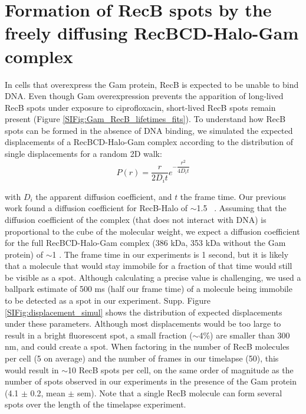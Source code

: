\section{Formation of RecB spots by the freely diffusing RecBCD-Halo-Gam complex}
\label{note:spurious_spots}
In cells that overexpress the Gam protein, RecB is expected to be unable to bind DNA. Even though Gam overexpression prevents the apparition of long-lived RecB spots under exposure to ciprofloxacin, short-lived RecB spots remain present (Figure \ref{SIFig:Gam_RecB_lifetimes_fits}). To understand how RecB spots can be formed in the absence of DNA binding, we simulated the expected displacements of a RecBCD-Halo-Gam complex according to the distribution of single displacements for a random 2D walk:
\begin{equation}
    P(r) = \dfrac{r}{2D_i t}e^{-\dfrac{r^2}{4D_i t}}
\end{equation}

with $D_i$ the apparent diffusion coefficient, and $t$ the frame time. Our previous work found a diffusion coefficient for RecB-Halo of $\sim$1.5 \ums\ \cite{Lepore2023}. Assuming that the diffusion coefficient of the complex (that does not interact with DNA) is proportional to the cube of the molecular weight, we expect a diffusion coefficient for the full RecBCD-Halo-Gam complex (386 kDa, 353 kDa without the Gam protein) of $\sim$1 \ums. The frame time in our experiments is 1 second, but it is likely that a molecule that would stay immobile for a fraction of that time would still be visible as a spot. Although calculating a precise value is challenging, we used a ballpark estimate of 500 ms (half our frame time) of a molecule being immobile to be detected as a spot in our experiment. Supp. Figure \ref{SIFig:displacement_simul} shows the distribution of expected displacements under these parameters. Although most displacements would be too large to result in a bright fluorescent spot, a small fraction ($\sim$4\%) are smaller than 300 nm, and could create a spot. When factoring in the number of RecB molecules per cell (5 on average\cite{Lepore2019a}) and the number of frames in our timelapse (50), this would result in $\sim$10 RecB spots per cell, on the same order of magnitude as the number of spots observed in our experiments in the presence of the Gam protein (4.1 $\pm$ 0.2, mean $\pm$ sem). Note that a single RecB molecule can form several spots over the length of the timelapse experiment.

\clearpage

\setlength\intextsep{40pt}

